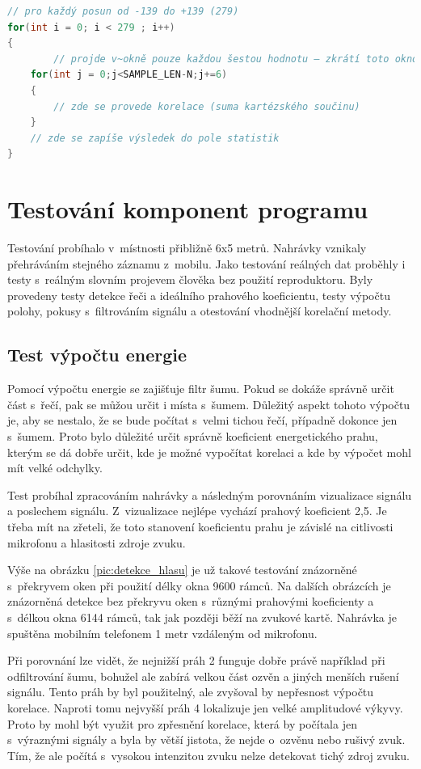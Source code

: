\begin{lstlisting}[language=C]
// pro každý posun od -139 do +139 (279)
for(int i = 0; i < 279 ; i++)       
{
        // projde v~okně pouze každou šestou hodnotu – zkrátí toto okno o~N vzorků
	for(int j = 0;j<SAMPLE_LEN-N;j+=6)      
	{	
		// zde se provede korelace (suma kartézského součinu)
	}
    // zde se zapíše výsledek do pole statistik
}
\end{lstlisting}

\chapter{Testování komponent programu}
\label{testovani}

Testování probíhalo v~místnosti přibližně 6x5 metrů. Nahrávky vznikaly přehráváním stejného záznamu z~mobilu. Jako testování reálných dat proběhly i testy s~reálným slovním projevem člověka bez použití reproduktoru. Byly provedeny testy detekce řeči a ideálního prahového koeficientu, testy výpočtu polohy, pokusy s~filtrováním signálu a otestování vhodnější korelační metody.

\section{Test výpočtu energie}

Pomocí výpočtu energie se zajišťuje filtr šumu. Pokud se dokáže správně určit část s~řečí, pak se můžou určit i místa s~šumem. Důležitý aspekt tohoto výpočtu je, aby se nestalo, že se bude počítat s~velmi tichou řečí, případně dokonce jen s~šumem. Proto bylo důležité určit správně koeficient energetického prahu, kterým se dá dobře určit, kde je možné vypočítat korelaci a kde by výpočet mohl mít velké odchylky.

Test probíhal zpracováním nahrávky a následným porovnáním vizualizace signálu a poslechem signálu. Z~vizualizace nejlépe vychází prahový koeficient 2,5. Je třeba mít na zřeteli, že toto stanovení koeficientu prahu je závislé na citlivosti mikrofonu a hlasitosti zdroje zvuku.

Výše na obrázku \ref{pic:detekce_hlasu} je už takové testování znázorněné s~překryvem oken při použití délky okna 9600 rámců. Na dalších obrázcích je znázorněná detekce bez překryvu oken s~různými prahovými koeficienty a s~délkou okna 6144 rámců, tak jak později běží na zvukové kartě. Nahrávka je spuštěna mobilním telefonem 1 metr vzdáleným od mikrofonu.

Při porovnání lze vidět, že nejnižší práh 2 funguje dobře právě například při odfiltrování šumu, bohužel ale zabírá velkou část ozvěn a jiných menších rušení signálu. Tento práh by byl použitelný, ale zvyšoval by nepřesnost výpočtu korelace. Naproti tomu nejvyšší práh 4 lokalizuje jen velké amplitudové výkyvy. Proto by mohl být využit pro zpřesnění korelace, která by počítala jen s~výraznými signály a byla by větší jistota, že nejde o~ozvěnu nebo rušivý zvuk. Tím, že ale počítá s~vysokou intenzitou zvuku nelze detekovat tichý zdroj zvuku.


